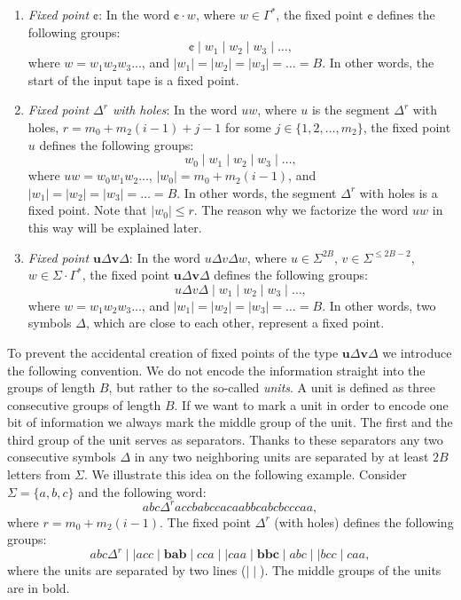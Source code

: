 \begin{enumerate}
\item \emph{Fixed point $\cent$}: In the word $\cent \cdot w$, where $w \in \Gamma^*$, the fixed point $\cent$ defines the following groups:
$$\cent \mid w_1 \mid w_2 \mid w_3 \mid \ldots,$$
where $w = w_1 w_2 w_3 \ldots$, and $|w_1| = |w_2| = |w_3| = \ldots = B$. In other words, the start of the input tape is a fixed point.

\item \emph{Fixed point $\Delta^r$ with holes}: In the word $u w$, where $u$ is the segment $\Delta^r$ with holes, $r = m_0 + m_2 (i - 1) + j - 1$ for some $j \in \{1, 2, \ldots, m_2\}$, the fixed point $u$ defines the following groups:
$$w_0 \mid w_1 \mid w_2 \mid w_3 \mid \ldots,$$
where $u w = w_0 w_1 w_2 \ldots$, $|w_0| = m_0 + m_2 (i - 1)$, and $|w_1| = |w_2| = |w_3| = \ldots = B$. In other words, the segment $\Delta^r$ with holes is a fixed point. Note that $|w_0| \le r$. The reason why we factorize the word $u w$ in this way will be explained later.

\item \emph{Fixed point $\mathbf{u} \Delta \mathbf{v} \Delta$}: In the word $u \Delta v \Delta w$, where $u \in \Sigma^{2B}$, $v \in \Sigma^{\le 2B - 2}$, $w \in \Sigma \cdot \Gamma^*$, the fixed point $\mathbf{u} \Delta \mathbf{v} \Delta$ defines the following groups:
$$u \Delta v \Delta \mid w_1 \mid w_2 \mid w_3 \mid \ldots,$$
where $w = w_1 w_2 w_3 \ldots$, and $|w_1| = |w_2| = |w_3| = \ldots = B$. In other words, two symbols $\Delta$, which are close to each other, represent a fixed point.
\end{enumerate}

To prevent the accidental creation of fixed points of the type $\mathbf{u} \Delta \mathbf{v} \Delta$ we introduce the following convention. We do not encode the information straight into the groups of length $B$, but rather to the so-called \emph{units}. A unit is defined as three consecutive groups of length $B$. If we want to mark a unit in order to encode one bit of information we always mark the middle group of the unit. The first and the third group of the unit serves as separators. Thanks to these separators any two consecutive symbols $\Delta$ in any two neighboring units are separated by at least $2B$ letters from $\Sigma$. We illustrate this idea on the following example. Consider $\Sigma = \{a, b, c\}$ and the following word:
$$abc \Delta^r acc bab cca caa bbc abc bcc caa,$$
where $r = m_0 + m_2 (i - 1)$. The fixed point $\Delta^r$ (with holes) defines the following groups:
$$abc \Delta^r \mid \mid acc \mid \mathbf{bab} \mid cca \mid \mid caa \mid \mathbf{bbc} \mid abc \mid \mid bcc \mid caa,$$
where the units are separated by two lines ($\mid \mid$). The middle groups of the units are in bold.


